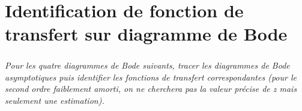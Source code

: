 \documentclass[10pt,fleqn]{article} %
\begin{document}
\begin{multicols}{2}
\begin{corrige}
\end{corrige}
\else
\fi

\section*{Identification de fonction de transfert sur diagramme de Bode}
\subparagraph*{}
\textit{Pour les quatre diagrammes de Bode suivants, tracer les diagrammes de Bode asymptotiques puis identifier les fonctions de transfert correspondantes (pour le second ordre faiblement amorti, on ne cherchera pas la valeur précise de z mais seulement une estimation).}

\ifprof
\else
\end{multicols}
\fi
\end{document}
